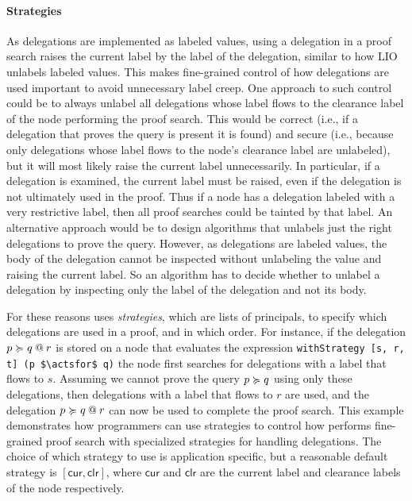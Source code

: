 \paragraph{Strategies}
As delegations are implemented as labeled values, using a delegation in a proof search raises the current label by the label of the delegation, similar to how LIO unlabels labeled values. This makes fine-grained control of how delegations are used important to avoid unnecessary label creep. One approach to such control could be to always unlabel all delegations whose label flows to the clearance label of the node performing the proof search. This would be correct (i.e., if a delegation that proves the query is present it is found) and secure (i.e., because only delegations whose label flows to the node's clearance label are unlabeled), but it will most likely raise the current label unnecessarily. In particular, if a delegation is examined, the current label must be raised, even if the delegation is not ultimately used in the proof. Thus if a node has a delegation labeled with a very restrictive label, then all proof searches could be tainted by that label.
An alternative approach would be to design algorithms that unlabels just the right delegations to prove the query. However, as delegations are labeled values, the body of the delegation cannot be inspected without unlabeling the value and raising the current label. So an algorithm has to decide whether to unlabel a delegation by inspecting only the label of the delegation and not its body.

For these reasons \lang{} uses \emph{strategies}, which are lists of principals, to specify which delegations are used in a proof, and in which order. For instance, if the delegation $\lb{r}{p \actsfor q}$ is stored on a node that evaluates the expression \lstinline[mathescape]!withStrategy [s, r, t] (p $\actsfor$ q)! the node first searches for delegations with a label that flows to $s$. Assuming we cannot prove the query $p \actsfor q$ using only these delegations, then delegations with a label that flows to $r$ are used, and the delegation $\lb{r}{p \actsfor q}$ can now be used to complete the proof search. This example demonstrates how programmers can use strategies to control how \lang{} performs fine-grained proof search with specialized strategies for handling delegations. The choice of which strategy to use is application specific, but a reasonable default strategy is $[\mathsf{cur}, \mathsf{clr}]$, where $\mathsf{cur}$ and $\mathsf{clr}$ are the current label and clearance labels of the node respectively.


